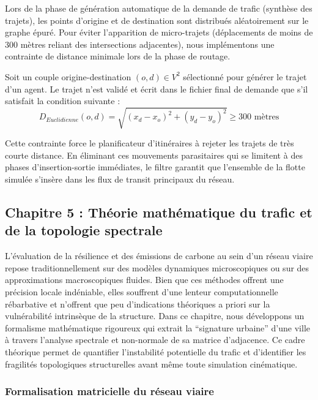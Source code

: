 \documentclass[10pt, a4paper]{article}
\begin{document}
Lors de la phase de génération automatique de la demande de trafic
(synthèse des trajets), les points d'origine et de destination sont
distribués aléatoirement sur le graphe épuré. Pour éviter l'apparition
de micro-trajets (déplacements de moins de 300 mètres reliant des
intersections adjacentes), nous implémentons une contrainte de distance
minimale lors de la phase de routage.

Soit un couple origine-destination \((o, d) \in V^2\) sélectionné pour
générer le trajet d'un agent. Le trajet n'est validé et écrit dans le
fichier final de demande que s'il satisfait la condition suivante :
\[D_{Euclidienne}(o, d) = \sqrt{(x_d - x_o)^2 + (y_d - y_o)^2} \ge 300 \text{ mètres}\]

Cette contrainte force le planificateur d'itinéraires à rejeter les
trajets de très courte distance. En éliminant ces mouvements
parasitaires qui se limitent à des phases d'insertion-sortie immédiates,
le filtre garantit que l'ensemble de la flotte simulée s'insère dans les
flux de transit principaux du réseau.

\newpage

\subsection{Chapitre 5 : Théorie mathématique du trafic et de la
topologie
spectrale}\label{chapitre-5-thuxe9orie-mathuxe9matique-du-trafic-et-de-la-topologie-spectrale}

L'évaluation de la résilience et des émissions de carbone au sein d'un
réseau viaire repose traditionnellement sur des modèles dynamiques
microscopiques ou sur des approximations macroscopiques fluides. Bien
que ces méthodes offrent une précision locale indéniable, elles
souffrent d'une lenteur computationnelle rébarbative et n'offrent que
peu d'indications théoriques a priori sur la vulnérabilité intrinsèque
de la structure. Dans ce chapitre, nous développons un formalisme
mathématique rigoureux qui extrait la ``signature urbaine'' d'une ville
à travers l'analyse spectrale et non-normale de sa matrice d'adjacence.
Ce cadre théorique permet de quantifier l'instabilité potentielle du
trafic et d'identifier les fragilités topologiques structurelles avant
même toute simulation cinématique.

\subsubsection{Formalisation matricielle du réseau
viaire}\label{formalisation-matricielle-du-ruxe9seau-viaire}
\end{document}
